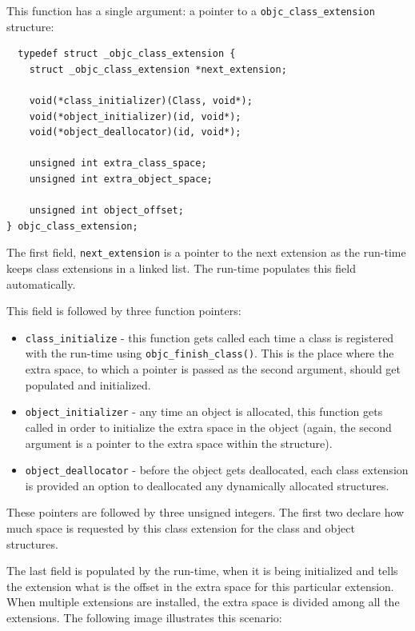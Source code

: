 This function has a single argument: a pointer to a \verb=objc_class_extension= structure:

\begin{verbatim}
  typedef struct _objc_class_extension {
    struct _objc_class_extension *next_extension;

    void(*class_initializer)(Class, void*);
    void(*object_initializer)(id, void*);
    void(*object_deallocator)(id, void*);
	
    unsigned int extra_class_space;
    unsigned int extra_object_space;
	
    unsigned int object_offset;
} objc_class_extension;
\end{verbatim}

The first field, \verb=next_extension= is a pointer to the next extension as the run-time keeps class extensions in a linked list. The run-time populates this field automatically.

This field is followed by three function pointers:

\begin{itemize}
  \item \verb=class_initialize= - this function gets called each time a class is registered with the run-time using \verb=objc_finish_class()=. This is the place where the extra space, to which a pointer is passed as the second argument, should get populated and initialized.
  
  \item \verb=object_initializer= - any time an object is allocated, this function gets called in order to initialize the extra space in the object (again, the second argument is a pointer to the extra space within the structure).
  
  \item \verb=object_deallocator= - before the object gets deallocated, each class   extension is provided an option to deallocated any dynamically allocated structures.
\end{itemize}

These pointers are followed by three unsigned integers. The first two declare how much space is requested by this class extension for the class and object structures.

The last field is populated by the run-time, when it is being initialized and tells the extension what is the offset in the extra space for this particular extension. When multiple extensions are installed, the extra space is divided among all the extensions. The following image illustrates this scenario: \newline{}

